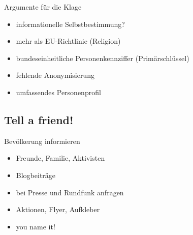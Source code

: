 \documentclass[ignorenonframetext,ucs]{beamer}
\begin{document}
\begin{frame}{Argumente für die Klage}\begin{itemize}
\item informationelle Selbstbestimmung?
\item mehr als EU-Richtlinie (Religion)
\item bundeseinheitliche Personenkennziffer (Primärschlüssel)
\item fehlende Anonymisierung
\item umfassendes Personenprofil
\end{itemize}\end{frame}

\subsection{Tell a friend!}

\begin{frame}{Bevölkerung informieren}\begin{itemize}
\item Freunde, Familie, Aktivisten
\item Blogbeiträge
\item bei Presse und Rundfunk anfragen
\item Aktionen, Flyer, Aufkleber
\item you name it!
\end{itemize}\end{frame}
\end{document}
